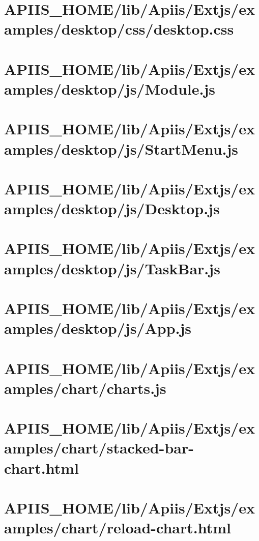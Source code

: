 \section{APIIS\_HOME/lib/Apiis/Extjs/examples/desktop/css/desktop.css} 
\section{APIIS\_HOME/lib/Apiis/Extjs/examples/desktop/js/Module.js} 
\section{APIIS\_HOME/lib/Apiis/Extjs/examples/desktop/js/StartMenu.js} 
\section{APIIS\_HOME/lib/Apiis/Extjs/examples/desktop/js/Desktop.js} 
\section{APIIS\_HOME/lib/Apiis/Extjs/examples/desktop/js/TaskBar.js} 
\section{APIIS\_HOME/lib/Apiis/Extjs/examples/desktop/js/App.js} 
\section{APIIS\_HOME/lib/Apiis/Extjs/examples/chart/charts.js} 
\section{APIIS\_HOME/lib/Apiis/Extjs/examples/chart/stacked-bar-chart.html} 
\section{APIIS\_HOME/lib/Apiis/Extjs/examples/chart/reload-chart.html} 
